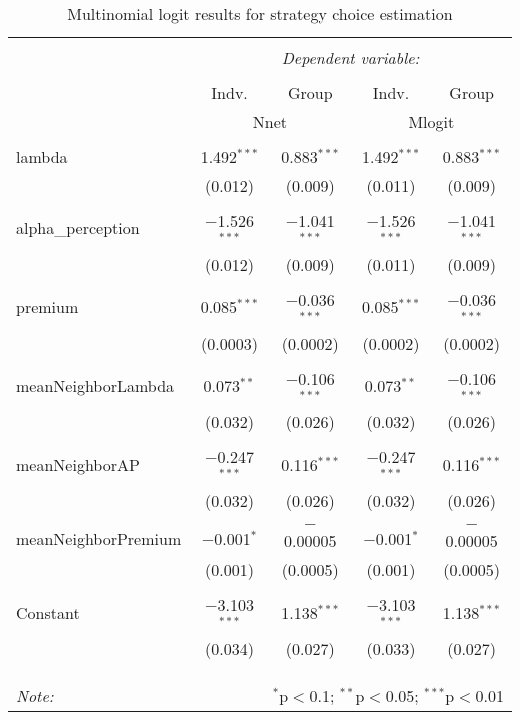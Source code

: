 
\begin{table}[!htbp] \centering 
  \caption{Multinomial logit results for strategy choice estimation} 
  \label{Tab:InformationConfidence-StrategyChoice-multinom} 
\begin{tabular}{@{\extracolsep{5pt}}lcccc} 
\\[-1.8ex]\hline 
\hline \\[-1.8ex] 
 & \multicolumn{4}{c}{\textit{Dependent variable:}} \\ 
\cline{2-5} 
\\[-1.8ex] & Indv. & Group & Indv. & Group \\ 
 & \multicolumn{2}{c}{Nnet} & \multicolumn{2}{c}{Mlogit} \\ 
\hline \\[-1.8ex] 
 lambda & 1.492$^{***}$ & 0.883$^{***}$ & 1.492$^{***}$ & 0.883$^{***}$ \\ 
  & (0.012) & (0.009) & (0.011) & (0.009) \\ 
  & & & & \\ 
 alpha\_perception & $-$1.526$^{***}$ & $-$1.041$^{***}$ & $-$1.526$^{***}$ & $-$1.041$^{***}$ \\ 
  & (0.012) & (0.009) & (0.011) & (0.009) \\ 
  & & & & \\ 
 premium & 0.085$^{***}$ & $-$0.036$^{***}$ & 0.085$^{***}$ & $-$0.036$^{***}$ \\ 
  & (0.0003) & (0.0002) & (0.0002) & (0.0002) \\ 
  & & & & \\ 
 meanNeighborLambda & 0.073$^{**}$ & $-$0.106$^{***}$ & 0.073$^{**}$ & $-$0.106$^{***}$ \\ 
  & (0.032) & (0.026) & (0.032) & (0.026) \\ 
  & & & & \\ 
 meanNeighborAP & $-$0.247$^{***}$ & 0.116$^{***}$ & $-$0.247$^{***}$ & 0.116$^{***}$ \\ 
  & (0.032) & (0.026) & (0.032) & (0.026) \\ 
  & & & & \\ 
 meanNeighborPremium & $-$0.001$^{*}$ & $-$0.00005 & $-$0.001$^{*}$ & $-$0.00005 \\ 
  & (0.001) & (0.0005) & (0.001) & (0.0005) \\ 
  & & & & \\ 
 Constant & $-$3.103$^{***}$ & 1.138$^{***}$ & $-$3.103$^{***}$ & 1.138$^{***}$ \\ 
  & (0.034) & (0.027) & (0.033) & (0.027) \\ 
  & & & & \\ 
\hline \\[-1.8ex] 
\hline 
\hline \\[-1.8ex] 
\textit{Note:}  & \multicolumn{4}{r}{$^{*}$p$<$0.1; $^{**}$p$<$0.05; $^{***}$p$<$0.01} \\ 
\end{tabular} 
\end{table} 
